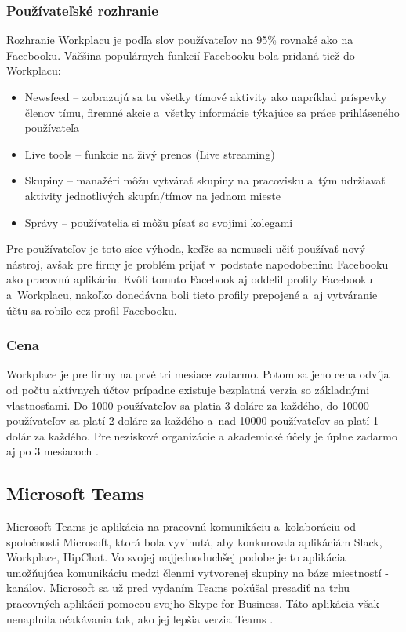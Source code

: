 \subsubsection{Používateľské rozhranie}
\indent Rozhranie Workplacu je podľa slov používateľov na 95\% rovnaké ako na Facebooku. Väčšina populárnych funkcií Facebooku bola pridaná tiež do Workplacu:
\begin{itemize}
    \item Newsfeed – zobrazujú sa tu všetky tímové aktivity ako napríklad príspevky členov tímu, firemné akcie a všetky informácie týkajúce sa práce prihláseného používateľa
    \item Live tools – funkcie na živý prenos (Live streaming)
    \item Skupiny – manažéri môžu vytvárať skupiny na pracovisku a tým udržiavať aktivity jednotlivých skupín/tímov na jednom  mieste
    \item Správy – používatelia si môžu písať so svojimi kolegami
\end{itemize}

\indent Pre používateľov je toto síce výhoda, keďže sa nemuseli učiť používať nový nástroj, avšak pre firmy je problém prijať v podstate napodobeninu Facebooku ako pracovnú aplikáciu. Kvôli tomuto Facebook aj oddelil profily Facebooku a Workplacu, nakoľko donedávna boli tieto profily prepojené a aj vytváranie účtu sa robilo cez profil Facebooku. 
\subsubsection{Cena}
\indent Workplace je pre firmy na prvé tri mesiace zadarmo. Potom sa jeho cena odvíja od počtu aktívnych účtov prípadne existuje bezplatná verzia so základnými vlastnosťami. Do 1000 používateľov sa platia 3 doláre za každého, do 10000 používateľov sa platí 2 doláre za každého a nad 10000 používateľov sa platí 1 dolár za každého.  Pre neziskové organizácie a akademické účely je úplne zadarmo aj po 3 mesiacoch \cite{facebook_workplace,facebook_workplace_2}.

\subsection{Microsoft Teams}
\indent Microsoft Teams je aplikácia na pracovnú komunikáciu a kolaboráciu od spoločnosti Microsoft, ktorá bola vyvinutá, aby konkurovala aplikáciám Slack, Workplace, HipChat. Vo svojej najjednoduchšej podobe je to aplikácia umožňujúca komunikáciu medzi členmi vytvorenej skupiny na báze miestností - kanálov. Microsoft sa už pred vydaním Teams pokúšal presadiť na trhu pracovných aplikácií pomocou svojho Skype for Business. Táto aplikácia však nenaplnila očakávania tak, ako jej lepšia verzia Teams \cite{ms_teams}. 
